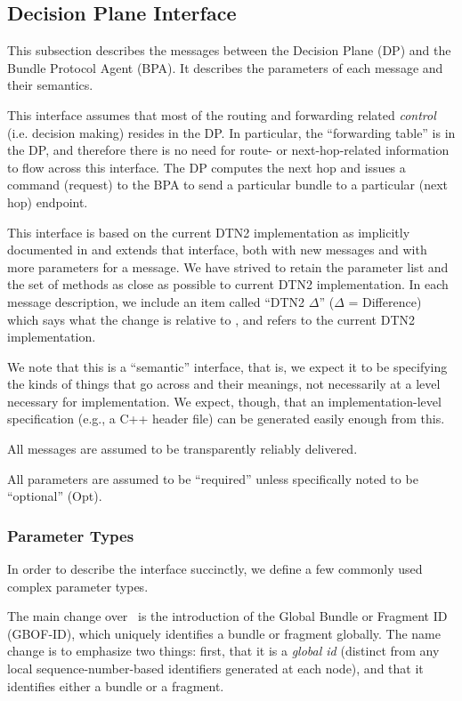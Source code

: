 \subsection{Decision Plane Interface}
\label{sec:dpintf}

This subsection describes the messages between the Decision Plane (DP) and
the Bundle Protocol Agent (BPA). It describes the parameters of each message
and their semantics.

This interface assumes that most of the routing and forwarding related
{\em control} (i.e. decision making) resides in the DP. In
particular, the ``forwarding table'' is in the DP, and therefore there
is no need for route- or next-hop-related information to flow across
this interface.  The DP computes the next hop and issues a command
(request) to the BPA to send a particular bundle to a particular (next
hop) endpoint.

This interface is based on the current DTN2 implementation as implicitly
documented in \cite{MITRE-IF}
and extends that interface, both with new messages and with more parameters
for a message. We have strived to retain the parameter list and the set
of methods as close as possible to current DTN2 implementation.
In each message description, we include an item called ``DTN2 $\Delta$''
($\Delta$ = Difference) which says what the change is relative to
\cite{MITRE-IF}, and refers to the current DTN2 implementation.

We note that this is a ``semantic'' interface, that is, we expect it to
be specifying the kinds of things that go across and their meanings,
not necessarily at a level necessary for implementation. We expect, though,
that an implementation-level specification (e.g., a C++ header file) can 
be generated easily enough from this.

All messages are assumed to be transparently reliably delivered. 

All parameters are assumed to be ``required'' unless specifically
noted to be ``optional'' (Opt).

\subsubsection{Parameter Types}

In order to describe the interface succinctly, we define a few commonly used
complex parameter types.

The main change over~\cite{MITRE-IF} is the introduction of the Global
Bundle or Fragment ID (GBOF-ID), which uniquely identifies a bundle
or fragment globally. The name change is to emphasize two things:
first, that it is a {\em global id} (distinct from any local
sequence-number-based identifiers generated at each node), and that it
identifies either a bundle or a fragment.

